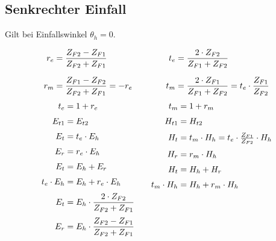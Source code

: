 \subsection[Senkrechter Einfall]{Senkrechter Einfall}
Gilt bei Einfallswinkel $ \theta_h = 0 $.

\begin{equation*}
\setlength{\jot}{10pt}
\begin{aligned}[t]
%
	r_e &= \frac{Z_{F2}-Z_{F1}}{Z_{F2} + Z_{F1}}\\
	r_m &= \frac{Z_{F1}-Z_{F2}}{Z_{F2} + Z_{F1}}
	=-r_e\\
\end{aligned}
\qquad \qquad
\begin{aligned}[t]
	t_e  &= \frac{2 \cdot Z_{F2}}{Z_{F1} + Z_{F2}}\\ 
	t_m  &= \frac{2 \cdot Z_{F1}}{Z_{F1} + Z_{F2}}
	= t_e \cdot \frac{Z_{F1}}{Z_{F2}}\\
\end{aligned}
\end{equation*}
\vspace{0.2cm}
\begin{equation*}
\setlength{\jot}{6pt}
\begin{aligned}[t]
	t_e & = 1+ r_e \\	
	E_{t1} & =E_{t2}\\
    E_t & = t_e \cdot E_h \\
	E_r & = r_e \cdot E_h \\
	E_t & = E_h + E_r \\        
	t_e\cdot E_{h} & = E_{h} + r_e\cdot  E_{h} \\
	E_t &= E_h \cdot \frac{2 \cdot Z_{F2}}{Z_{F2} + Z_{F1}}\\
	E_r &= E_h \cdot \frac{Z_{F2}-Z_{F1}}{Z_{F2}+Z_{F1}}
\end{aligned}
\qquad
\begin{aligned}[t]
	t_m & = 1+ r_m \\
	H_{t1} &= H_{t2}\\
	H_t & = t_m \cdot H_h  = t_e \cdot \tfrac{Z_{F1}}{Z_{F2}} \cdot H_h \\
	H_r & = r_m \cdot H_h \\
	H_t & = H_h + H_r \\        
	t_m\cdot H_{h} & = H_{h} + r_m\cdot  H_{h} \\
\end{aligned}
\end{equation*}

